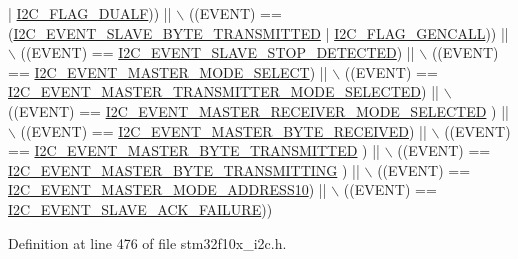 \begin{DoxyCode}
      | \hyperlink{group___i2_c__flags__definition_ga3755b783aa73568659478c2e2e45e27f}{I2C\_FLAG\_DUALF})) || \(\backslash\)
                             ((EVENT) == (\hyperlink{group___i2_c___events_ga50652880323b8c2746b5afbdfea03fe1}{I2C\_EVENT\_SLAVE\_BYTE\_TRANSMITTED} 
      | \hyperlink{group___i2_c__flags__definition_gab3a93b6840ad406c2fc09e0e96c59b88}{I2C\_FLAG\_GENCALL})) || \(\backslash\)
                             ((EVENT) == \hyperlink{group___i2_c___events_ga3148d8d7087e418959bc31e2646b2941}{I2C\_EVENT\_SLAVE\_STOP\_DETECTED}) || \(\backslash\)
                             ((EVENT) == \hyperlink{group___i2_c___events_gaeef8c22ac035122b06e31b360ac7aeb3}{I2C\_EVENT\_MASTER\_MODE\_SELECT}) || \(\backslash\)
                             ((EVENT) == 
      \hyperlink{group___i2_c___events_ga2361a6e60b7dc86fb682dd06fbd3edb7}{I2C\_EVENT\_MASTER\_TRANSMITTER\_MODE\_SELECTED}) || \(\backslash\)
                             ((EVENT) == \hyperlink{group___i2_c___events_gabfde82864432ddb87b6462234d542e60}{I2C\_EVENT\_MASTER\_RECEIVER\_MODE\_SELECTED}
      ) || \(\backslash\)
                             ((EVENT) == \hyperlink{group___i2_c___events_ga6bcf2ae49961e07e27cf9fdf334719e3}{I2C\_EVENT\_MASTER\_BYTE\_RECEIVED}) || \(\backslash\)
                             ((EVENT) == \hyperlink{group___i2_c___events_ga8fe3b96b54e3c38e1de5d48536039c8f}{I2C\_EVENT\_MASTER\_BYTE\_TRANSMITTED}
      ) || \(\backslash\)
                             ((EVENT) == \hyperlink{group___i2_c___events_ga037ac1e67e44ee085acac6f034bd73b2}{I2C\_EVENT\_MASTER\_BYTE\_TRANSMITTING}
      ) || \(\backslash\)
                             ((EVENT) == \hyperlink{group___i2_c___events_gad04882597bbf542c6fee7a9c837fbc8c}{I2C\_EVENT\_MASTER\_MODE\_ADDRESS10}) ||
       \(\backslash\)
                             ((EVENT) == \hyperlink{group___i2_c___events_ga249bd611f1ca64653c0bfc606c591088}{I2C\_EVENT\_SLAVE\_ACK\_FAILURE}))
\end{DoxyCode}


Definition at line 476 of file stm32f10x\+\_\+i2c.\+h.

